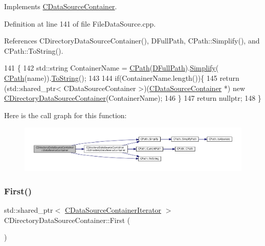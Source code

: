Implements \hyperlink{classCDataSourceContainer_abebf1b9a6168b6783ee9753df612e511}{C\+Data\+Source\+Container}.



Definition at line 141 of file File\+Data\+Source.\+cpp.



References C\+Directory\+Data\+Source\+Container(), D\+Full\+Path, C\+Path\+::\+Simplify(), and C\+Path\+::\+To\+String().


\begin{DoxyCode}
141                                                                                                            
        \{
142     std::string ContainerName = \hyperlink{classCPath}{CPath}(\hyperlink{classCDirectoryDataSourceContainer_ac3d3c7e7d7bc9f68ba8a8747a3dee8b5}{DFullPath}).\hyperlink{classCPath_aa52dcb50c943a8abc8883db5ec43a45e}{Simplify}(
      \hyperlink{classCPath}{CPath}(name)).\hyperlink{classCPath_abbafaf377a7e38e0151bd9567d526951}{ToString}();
143     
144     \textcolor{keywordflow}{if}(ContainerName.length())\{
145         \textcolor{keywordflow}{return} (std::shared\_ptr< CDataSourceContainer >)(\hyperlink{classCDataSourceContainer}{CDataSourceContainer} *) \textcolor{keyword}{new} 
      \hyperlink{classCDirectoryDataSourceContainer_a62ef6d44201c6be66421b6c247f3b3bf}{CDirectoryDataSourceContainer}(ContainerName);
146     \}
147     \textcolor{keywordflow}{return} \textcolor{keyword}{nullptr};
148 \}
\end{DoxyCode}
Here is the call graph for this function\+:\nopagebreak
\begin{figure}[H]
\begin{center}
\leavevmode
\includegraphics[width=350pt]{classCDirectoryDataSourceContainer_a71291ab0a549056fc784f0c553a8dc39_cgraph}
\end{center}
\end{figure}
\hypertarget{classCDirectoryDataSourceContainer_a32aa8888dbf78f5a2a1ddb5324aad0cf}{}\label{classCDirectoryDataSourceContainer_a32aa8888dbf78f5a2a1ddb5324aad0cf} 
\subsubsection{\texorpdfstring{First()}{First()}}
{\footnotesize\ttfamily std\+::shared\+\_\+ptr$<$ \hyperlink{classCDataSourceContainerIterator}{C\+Data\+Source\+Container\+Iterator} $>$ C\+Directory\+Data\+Source\+Container\+::\+First (\begin{DoxyParamCaption}{ }\end{DoxyParamCaption})\hspace{0.3cm}{\ttfamily [virtual]}}



